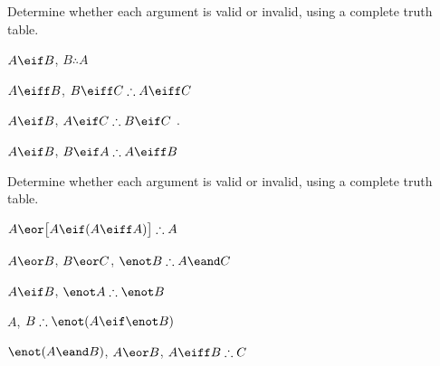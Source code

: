 \noindent\problempart
\label{pr.TT.valid2}
Determine whether each argument is valid or invalid, using a complete truth table.
\begin{compactlist}
\item $A\eif B$, $B \therefore  A$ \hfill {}

\item $A\eiff B$, $B\eiff C \therefore A\eiff C$ \hfill {}

\item $A \eif B$, $A \eif C\therefore B \eif C$ \hfill {}.

\item $A \eif B$, $B \eif A\therefore A \eiff B$ \hfill {} 
\end{compactlist}

\noindent\problempart
\label{pr.TT.valid3}
Determine whether each argument is valid or invalid, using a complete truth table.
\begin{compactlist}
\item $A\eor\bigl[A\eif(A\eiff A)\bigr] \therefore  A $\vspace{.5ex} \hfill {}
\item $A\eor B$, $B\eor C$, $\enot B \therefore A \eand C$\vspace{.5ex} \hfill {}
\item $A \eif B$, $\enot A\therefore \enot B$ \vspace{.5ex} \hfill {}
\item $A$, $B\therefore \enot(A\eif \enot B)$ \vspace{.5ex} \hfill {}
\item $\enot(A \eand B)$, $A \eor B$, $A \eiff B\therefore C$ \vspace{.5ex} \hfill {}
\end{compactlist}

